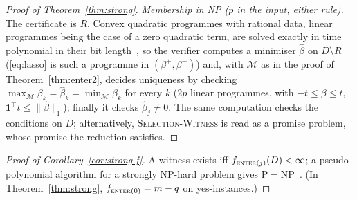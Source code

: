 \documentclass[10pt,a4paper]{article}
\theoremstyle{plain}
\theoremstyle{definition}
\theoremstyle{remark}
\newcommand{\Dm}{D\setminus R}
\newcommand{\tsc}[1]{\textnormal{\textsc{#1}}}  %
\begin{document}
\begin{proof}[Proof of Theorem~\ref{thm:strong}]
\emph{Membership in NP ($p$ in the input, either rule).} The certificate is $R$. Convex quadratic programmes with rational data, linear programmes being the case of a zero quadratic term, are solved exactly in time polynomial in their bit length~\citep{kozlov1980}, so the verifier computes a minimiser $\hat\beta$ on $\Dm$ (\eqref{eq:lasso} is such a programme in $(\beta^+,\beta^-)$) and, with $\mathcal M$ as in the proof of Theorem~\ref{thm:enter2}, decides uniqueness by checking $\max_{\mathcal M}\beta_k=\hat\beta_k=\min_{\mathcal M}\beta_k$ for every $k$ ($2p$ linear programmes, with $-t\le\beta\le t$, $\mathbf 1^{\top}t\le\lVert\hat\beta\rVert_1$); finally it checks $\hat\beta_j\ne0$. The same computation checks the conditions on $D$; alternatively, \tsc{Selection-Witness} is read as a promise problem, whose promise the reduction satisfies.
\end{proof}

\begin{proof}[Proof of Corollary~\ref{cor:strong-f}]
A witness exists iff $f_{\tsc{enter}(j)}(D)<\infty$; a pseudo-polynomial algorithm for a strongly NP-hard problem gives P${}={}$NP~\citep{garey1979}. (In Theorem~\ref{thm:strong}, $f_{\tsc{enter}(0)}=m-q$ on yes-instances.)
\end{proof}


{\footnotesize\setlength{\bibsep}{0pt}}
\end{document}
